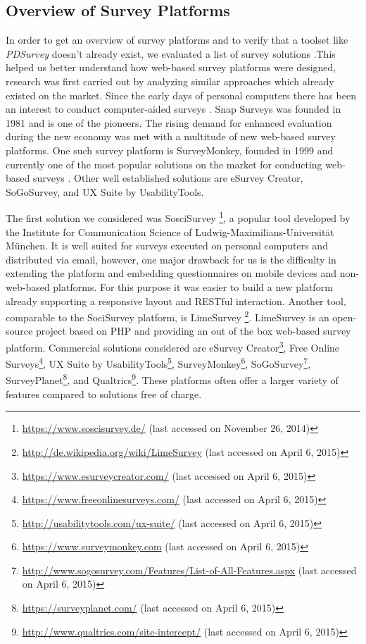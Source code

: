 





	\subsection{Overview of Survey Platforms}
	In order to get an overview of survey platforms and to verify that a toolset like \textit{PDSurvey} doesn't already exist, we evaluated a list of survey solutions \cite{Capterra2015SurveyTools, Idealware2011SurveyTools}.This helped us better understand how web-based survey platforms were designed, research was first carried out by analyzing similar approaches which already existed on the market. Since the early days of personal computers there has been an interest to conduct computer-aided surveys \cite{SnapSurveys2015AboutUs}. Snap Surveys was founded in 1981 and is one of the pioneers. The rising demand for enhanced evaluation during the new economy was met with a multitude of new web-based survey platforms. One such survey platform is SurveyMonkey, founded in 1999 and currently one of the most popular solutions on the market for conducting web-based surveys \cite{SurveyMonkeyAboutUs}. Other well established solutions are eSurvey Creator, SoGoSurvey, and UX Suite by UsabilityTools.

	The first solution we considered was SosciSurvey \footnote{\url{https://www.soscisurvey.de/} (last accessed on November 26, 2014)}, a popular tool developed by the Institute for Communication Science of Ludwig-Maximilians-Universit\"at M\"unchen. It is well suited for surveys executed on personal computers and distributed via email, however, one major drawback for us is the difficulty in extending the platform and embedding questionnaires on mobile devices and non-web-based platforms. For this purpose it was easier to build a new platform already supporting a responsive layout and RESTful interaction. Another tool, comparable to the SociSurvey platform, is LimeSurvey \footnote{\url{http://de.wikipedia.org/wiki/LimeSurvey} (last accessed on April 6, 2015)}. LimeSurvey is an open-source project based on PHP and providing an out of the box web-based survey platform.
	Commercial solutions considered are eSurvey Creator\footnote{\url{https://www.esurveycreator.com/} (last accessed on April 6, 2015)}, Free Online Surveys\footnote{\url{https://www.freeonlinesurveys.com/} (last accessed on April 6, 2015)}, UX Suite by UsabilityTools\footnote{\url{http://usabilitytools.com/ux-suite/} (last accessed on April 6, 2015)}, SurveyMonkey\footnote{\url{https://www.surveymonkey.com} (last accessed on April 6, 2015)}, SoGoSurvey\footnote{\url{http://www.sogosurvey.com/Features/List-of-All-Features.aspx} (last accessed on April 6, 2015)}, SurveyPlanet\footnote{\url{https://surveyplanet.com/} (last accessed on April 6, 2015)}, and Qualtrics\footnote{\url{http://www.qualtrics.com/site-intercept/} (last accessed on April 6, 2015)}. These platforms often offer a larger variety of features compared to solutions free of charge.

